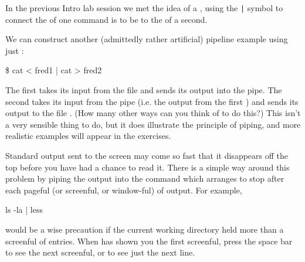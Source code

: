 

In the previous Intro lab session we met the idea of a , using the \verb+|+ symbol to connect the  of one command is to be  to the
 of a second.

We can construct another (admittedly rather artificial) pipeline example using
just :

\begin{ttoutenv}
\$  cat < fred1 | cat > fred2
\end{ttoutenv}

The first  takes its input from the file
 and sends its output into the pipe. The second
 takes its input from the pipe (i.e. the output from the
first ) and sends its output to the file . (How many
other ways can you think of to do this?)  This isn't a very sensible
thing to do, but it does illustrate the principle of piping, and more realistic examples
will appear in the exercises.

Standard output sent to the screen may come so fast that it
disappears off the top before you have had a chance to read it.
There is a simple way around this problem by piping the output into the command 
  which arranges to stop after each pageful (or screenful, or window-ful) of output. For example,
  \begin{ttoutenv}
  ls -la | less
  \end{ttoutenv}
  would be a wise precaution if the current working directory held
  more than a screenful of entries. When  has shown you the
  first screenful, press the space bar to see the next screenful,
  or  to see just the next line.


